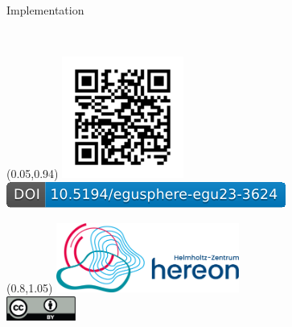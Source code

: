 \begin{frame}[t, plain]{}
\begin{textblock*}{\linewidth}
		\begin{block}{\center Implementation}
			\begin{center}
				\hspace{2.5em}
				\hyperlink{sec:core}{} \quad
				\hyperlink{sec:plugins}{} \quad
				\hyperlink{sec:federation}{} \\

				\vspace{1em}

				\hyperlink{sec:maintenance}{} \quad
				\hyperlink{sec:resources}{}
			\end{center}
		\end{block}
	\end{textblock*}

	\begin{textblock*}{0.4\textwidth}(0.05\textwidth,0.94\textheight)
		\href{https://github.com/Chilipp/mde-presentation-egu2023}{
			\includegraphics[width=4cm]{figures/qrcode-presentation.png}
		} \\
		\href{https://doi.org/10.5194/egusphere-egu23-3624}{
			\includegraphics[width=\textwidth]{figures/doi.pdf}
		}
	\end{textblock*}

	\begin{textblock*}{6cm}(0.8\textwidth,1.05\textheight)
		\raggedleft
		\hyperlink{frm:map}{\includegraphics[width=6cm]{figures/hereon.png}} \\
		\includegraphics[height=0.8cm]{figures/CreativeCommons_Attribution_License.png}
	\end{textblock*}

\end{frame}


